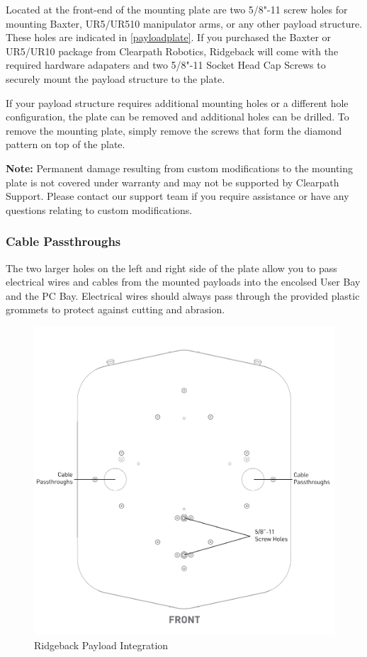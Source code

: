\documentclass[]{clearpath-latex/clearpath-manual}
\begin{document}
Located at the front-end of the mounting plate are two 5/8"-11 screw holes for mounting Baxter, UR5/UR510 manipulator arms, or any other payload structure.  These holes are indicated in \autoref{payloadplate}. If you purchased the Baxter or UR5/UR10 package from Clearpath Robotics, Ridgeback will come with the required hardware adapaters and two 5/8"-11 Socket Head Cap Screws to securely mount the payload structure to the plate.

If your payload structure requires additional mounting holes or a different hole configuration, the plate can be removed and additional holes can be drilled.  To remove the mounting plate, simply remove the screws that form the diamond pattern on top of the plate.

\textbf{Note:}  Permanent damage resulting from custom modifications to the mounting plate is not covered under warranty and may not be supported by Clearpath Support.  Please contact our support team if you require assistance or have any questions relating to custom modifications.


\subsubsection{Cable Passthroughs}

The two larger holes on the left and right side of the plate allow you to pass electrical wires and cables from the mounted payloads into the encolsed User Bay and the PC Bay.  Electrical wires should always pass through the provided plastic grommets to protect against cutting and abrasion.

\begin{figure}[!htb]
  \centering
  \includegraphics[width=0.75\linewidth]{Payload_Integration_Plate.pdf}
  \caption{Ridgeback Payload Integration}
  \label{payloadplate}
\end{figure}
\end{document}
